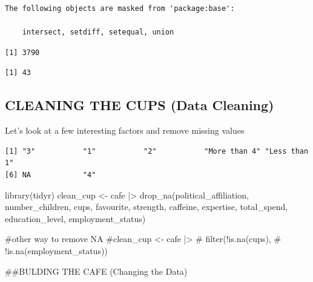 \documentclass[
  letterpaper,
  DIV=11,
  numbers=noendperiod]{scrartcl}
\newenvironment{Shaded}{\begin{snugshade}}{\end{snugshade}}
\newcommand{\CommentTok}[1]{\textcolor[rgb]{0.37,0.37,0.37}{#1}}
\newcommand{\FunctionTok}[1]{\textcolor[rgb]{0.28,0.35,0.67}{#1}}
\newcommand{\NormalTok}[1]{\textcolor[rgb]{0.00,0.23,0.31}{#1}}
\newcommand{\OtherTok}[1]{\textcolor[rgb]{0.00,0.23,0.31}{#1}}
\newcommand{\SpecialCharTok}[1]{\textcolor[rgb]{0.37,0.37,0.37}{#1}}
\begin{document}
\begin{verbatim}
The following objects are masked from 'package:base':

    intersect, setdiff, setequal, union
\end{verbatim}

\begin{verbatim}
[1] 3790
\end{verbatim}

\begin{verbatim}
[1] 43
\end{verbatim}

\subsection{CLEANING THE CUPS (Data
Cleaning)}\label{cleaning-the-cups-data-cleaning}

Let's look at a few interesting factors and remove missing values

\begin{Shaded}
\end{Shaded}

\begin{verbatim}
[1] "3"           "1"           "2"           "More than 4" "Less than 1"
[6] NA            "4"          
\end{verbatim}

\begin{Shaded}
\begin{Highlighting}[]
\FunctionTok{library}\NormalTok{(tidyr)}
\NormalTok{clean\_cup }\OtherTok{\textless{}{-}}\NormalTok{ cafe }\SpecialCharTok{|\textgreater{}} 
  \FunctionTok{drop\_na}\NormalTok{(political\_affiliation, number\_children, cups, favourite, strength, caffeine, expertise, total\_spend, education\_level, employment\_status)}

\CommentTok{\#other way to remove NA}
\CommentTok{\#clean\_cup \textless{}{-} cafe |\textgreater{}}
 \CommentTok{\# filter(!is.na(cups),}
        \CommentTok{\# !is.na(employment\_status))}
\end{Highlighting}
\end{Shaded}

\#\#BULDING THE CAFE (Changing the Data)
\end{document}
